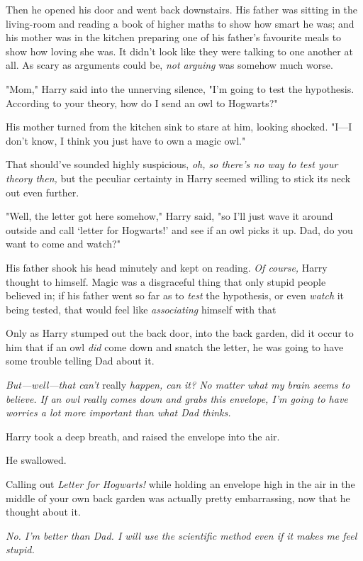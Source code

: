 Then he opened his door and went back downstairs. His father was sitting in the
living-room and reading a book of higher maths to show how smart he was; and
his mother was in the kitchen preparing one of his father's favourite meals to
show how loving she was. It didn't look like they were talking to one another
at all. As scary as arguments could be, \emph{not arguing} was somehow much
worse.

"Mom," Harry said into the unnerving silence, "I'm going to test the
hypothesis. According to your theory, how do I send an owl to Hogwarts?"

His mother turned from the kitchen sink to stare at him, looking shocked.
"I---I don't know, I think you just have to own a magic owl."

That should've sounded highly suspicious, \emph{oh, so there's no way to test
your theory then,} but the peculiar certainty in Harry seemed willing to stick
its neck out even further.

"Well, the letter got here somehow," Harry said, "so I'll just wave it around
outside and call `letter for Hogwarts!' and see if an owl picks it up. Dad, do
you want to come and watch?"

His father shook his head minutely and kept on reading. \emph{Of course,} Harry
thought to himself. Magic was a disgraceful thing that only stupid people
believed in; if his father went so far as to \emph{test} the hypothesis, or
even \emph{watch} it being tested, that would feel like \emph{associating}
himself with that{\el}

Only as Harry stumped out the back door, into the back garden, did it occur to
him that if an owl \emph{did} come down and snatch the letter, he was going to
have some trouble telling Dad about it.

\emph{But---well---that can't} really \emph{happen, can it? No matter what my
brain seems to believe. If an owl really comes down and grabs this envelope,
I'm going to have worries a lot more important than what Dad thinks.}

Harry took a deep breath, and raised the envelope into the air.

He swallowed.

Calling out \emph{Letter for Hogwarts!} while holding an envelope high in the
air in the middle of your own back garden was{\el} actually pretty
embarrassing, now that he thought about it.

\emph{No. I'm better than Dad. I will use the scientific method even if it
makes me feel stupid.}

